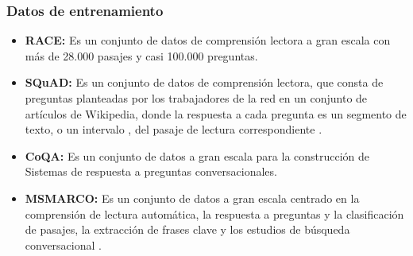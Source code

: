 \documentclass[../Main.tex]{subfiles}
\begin{document}
    \subsubsection{Datos de entrenamiento}
    \begin{itemize}
        \item \textbf{RACE:} Es un conjunto de datos de comprensión lectora a gran escala con más de 28.000 pasajes y casi 100.000 preguntas.

        \item \textbf{SQuAD:} Es un conjunto de datos de comprensión lectora, que consta de preguntas planteadas por los trabajadores de la red en un conjunto de artículos de Wikipedia, donde la respuesta a cada pregunta es un segmento de texto, o un intervalo , del pasaje de lectura correspondiente \cite{41}. %
        
        \item \textbf{CoQA:} Es un conjunto de datos a gran escala para la construcción de Sistemas de respuesta a preguntas conversacionales. 
        
        \item \textbf{MSMARCO:} Es un conjunto de datos a gran escala centrado en la comprensión de lectura automática, la respuesta a preguntas y la clasificación de pasajes, la extracción de frases clave y los estudios de búsqueda conversacional \cite{51}. %
    \end{itemize}
\end{document}
